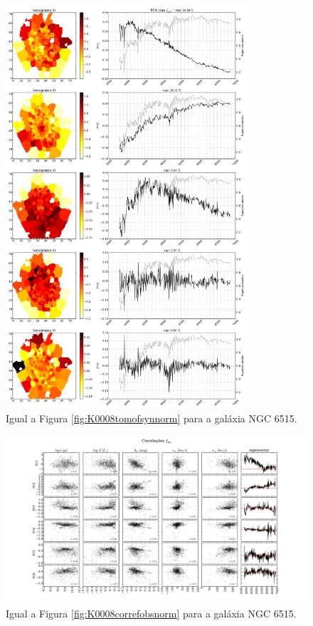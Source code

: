 \begin{figure}
    \includegraphics[width=0.8\textwidth]{figuras/K0864-tomo-syn-norm.pdf}
    \caption[Tomogramas de 1 a 5 para o cubo $f_{syn}$ - NGC 6515.]
    {Igual a Figura \ref{fig:K0008tomofsynnorm} para a galáxia NGC 6515.}
    \label{fig:K0864tomofsynnorm}
\end{figure}

\begin{figure}
    \includegraphics[width=1.3\textwidth, angle=-90]{figuras/K0864-correl-f_obs_norm-PCvsPhys.pdf}
	\caption[Correlações PCs vs. par\^ametros f\'isicos - $f_{obs}$ - NGC 6515.]
	{Igual a Figura \ref{fig:K0008correfobsnorm} para a galáxia NGC 6515.}
    \label{fig:K0864correfobsnorm}
\end{figure}

